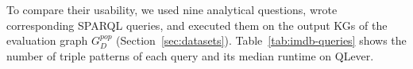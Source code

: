 To compare their usability, we used nine analytical questions, wrote corresponding SPARQL queries, and executed them on the output KGs of the evaluation graph \(G_D^{\mathit{pop}}\) (Section~\ref{sec:datasets}). Table~\ref{tab:imdb-queries} shows the number of triple patterns of each query and its median runtime on QLever. 

